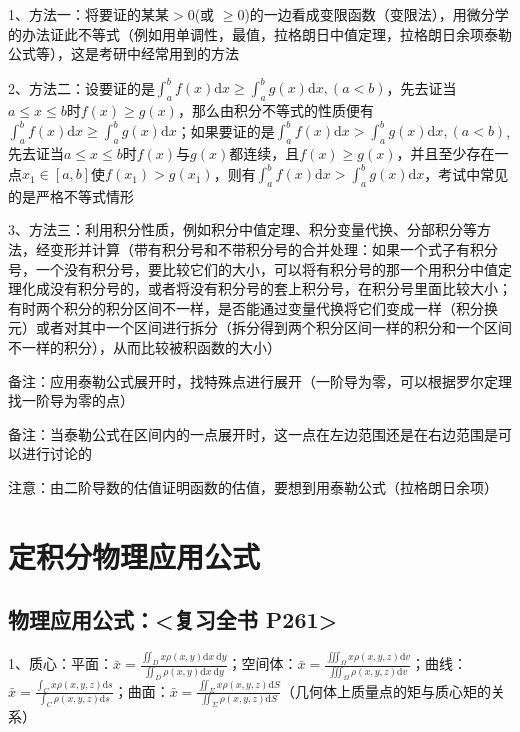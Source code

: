 1、方法一：将要证的某某$ \gt 0 $(或 $ \ge 0 $)的一边看成变限函数（变限法），用微分学的办法证此不等式（例如用单调性，最值，拉格朗日中值定理，拉格朗日余项泰勒公式等），这是考研中经常用到的方法

2、方法二：设要证的是$ \int_{a}^{b} f(x) \mathrm{d} x \geqslant \int_{a}^{b} g(x) \mathrm{d} x,(a<b) $，先去证当$ a \leqslant x \leqslant b $时$ f(x) \geqslant g(x) $，那么由积分不等式的性质便有 $ \int_{a}^{b} f(x) \mathrm{d} x \geqslant \int_{a}^{b} g(x) \mathrm{d} x $；如果要证的是$ \int_{a}^{b} f(x) \mathrm{d} x>\int_{a}^{b} g(x) \mathrm{d} x,(a<b) $, 先去证当$ a \leqslant x \leqslant b $时$ f(x) $与$ g(x) $都连续，且$ f(x) \geqslant g(x) $，并且至少存在一点$ x_{1} \in[a, b] $使$ f\left(x_{1}\right)>g\left(x_{1}\right) $，则有$ \int_{a}^{b} f(x) \mathrm{d} x>\int_{a}^{b} g(x) \mathrm{d} x $，考试中常见的是严格不等式情形

3、方法三：利用积分性质，例如积分中值定理、积分变量代换、分部积分等方法，经变形并计算（带有积分号和不带积分号的合并处理：如果一个式子有积分号，一个没有积分号，要比较它们的大小，可以将有积分号的那一个用积分中值定理化成没有积分号的，或者将没有积分号的套上积分号，在积分号里面比较大小；有时两个积分的积分区间不一样，是否能通过变量代换将它们变成一样（积分换元）或者对其中一个区间进行拆分（拆分得到两个积分区间一样的积分和一个区间不一样的积分），从而比较被积函数的大小）

备注：应用泰勒公式展开时，找特殊点进行展开（一阶导为零，可以根据罗尔定理找一阶导为零的点）

备注：当泰勒公式在区间内的一点展开时，这一点在左边范围还是在右边范围是可以进行讨论的

注意：由二阶导数的估值证明函数的估值，要想到用泰勒公式（拉格朗日余项）

\section{定积分物理应用公式}



\subsection{物理应用公式：<复习全书 P261>}

1、质心：平面：$ \bar{x}=\frac{\iint_{D} x \rho(x, y) \mathrm{d} x \mathrm{~d} y}{\iint_{D} \rho(x, y) \mathrm{d} x \mathrm{~d} y} $；空间体：$ \bar{x}=\frac{\iiint_{\Omega} x \rho(x, y, z) \mathrm{d} v}{\iiint_{\Omega} \rho(x, y, z) \mathrm{d} v} $；曲线：$ \bar{x}=\frac{\int_{C} x \rho(x, y, z) \mathrm{d} s}{\int_{C} \rho(x, y, z) \mathrm{d} s} $；曲面：$ \bar{x}=\frac{\iint_{\Sigma} x \rho(x, y, z) \mathrm{d} S}{\iint_{\Sigma} \rho(x, y, z) \mathrm{d} S} $（几何体上质量点的矩与质心矩的关系）

